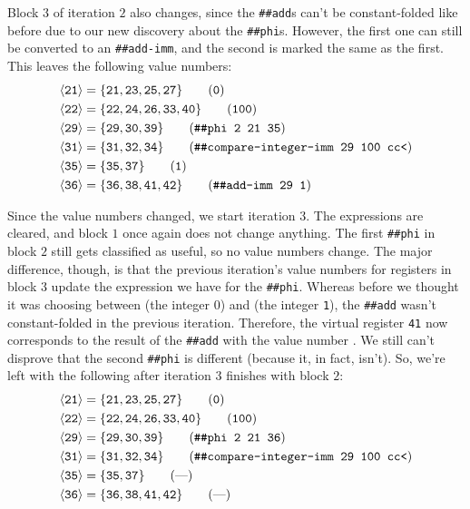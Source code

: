 Block $3$ of iteration $2$ also changes, since the \Verb|##add|s can't be
constant-folded like before due to our new discovery about the \Verb|##phi|s.
However, the first one can still be converted to an \Verb|##add-imm|, and the
second is marked the same as the first.  This leaves the following value
numbers:
%
\begin{align*}
  \vn{21} &= \{\vreg{21},
               \vreg{23},
               \vreg{25},
               \vreg{27}\} \tag{\texttt{0}} \\
  \vn{22} &= \{\vreg{22},
               \vreg{24},
               \vreg{26},
               \vreg{33},
               \vreg{40}\} \tag{\texttt{100}} \\
  \vn{29} &= \{\vreg{29},
               \vreg{30},
               \vreg{39}\} \tag{\texttt{\#\#phi 2 21 35}} \\
  \vn{31} &= \{\vreg{31},
               \vreg{32},
               \vreg{34}\} \tag{\texttt{\#\#compare-integer-imm 29 100 cc<}} \\
  \vn{35} &= \{\vreg{35},
               \vreg{37}\} \tag{\texttt{1}} \\
  \vn{36} &= \{\vreg{36},
               \vreg{38},
               \vreg{41},
               \vreg{42}\} \tag{\texttt{\#\#add-imm 29 1}}
\end{align*}

Since the value numbers changed, we start iteration $3$.  The expressions are
cleared, and block $1$ once again does not change anything.  The first
\Verb|##phi| in block $2$ still gets classified as useful, so no value
numbers change.  The major difference, though, is that the previous iteration's
value numbers for registers in block $3$ update the expression we have for the
\Verb|##phi|.  Whereas before we thought it was choosing between  (the
integer $0$) and  (the integer \Verb|1|), the \Verb|##add| wasn't
constant-folded in the previous iteration.  Therefore, the virtual register
\Verb|41| now corresponds to the result of the \Verb|##add| with the value
number .  We still can't disprove that the second \Verb|##phi| is
different (because it, in fact, isn't).  So, we're left with the following
after iteration $3$ finishes with block $2$:
%
\begin{align*}
  \vn{21} &= \{\vreg{21},
               \vreg{23},
               \vreg{25},
               \vreg{27}\} \tag{\texttt{0}} \\
  \vn{22} &= \{\vreg{22},
               \vreg{24},
               \vreg{26},
               \vreg{33},
               \vreg{40}\} \tag{\texttt{100}} \\
  \vn{29} &= \{\vreg{29},
               \vreg{30},
               \vreg{39}\} \tag{\texttt{\#\#phi 2 21 36}} \\
  \vn{31} &= \{\vreg{31},
               \vreg{32},
               \vreg{34}\} \tag{\texttt{\#\#compare-integer-imm 29 100 cc<}} \\
  \vn{35} &= \{\vreg{35},
               \vreg{37}\} \tag{\text{---}} \\
  \vn{36} &= \{\vreg{36},
               \vreg{38},
               \vreg{41},
               \vreg{42}\} \tag{\text{---}}
\end{align*}

